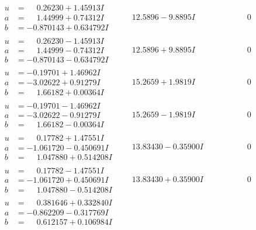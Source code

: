 \documentclass[1p]{elsarticle_modified}
\theoremstyle{definition}
\begin{document}
$$\begin{array}{c|c|c}
\begin{aligned}
u &= \phantom{-}0.26230 + 1.45913 I \\
a &= \phantom{-}1.44999 + 0.74312 I \\
b &= -0.870143 + 0.634792 I\end{aligned}
 & \phantom{-}12.5896 - 9.8895 I & \phantom{-0.000000 } 0 \\ \hline\begin{aligned}
u &= \phantom{-}0.26230 - 1.45913 I \\
a &= \phantom{-}1.44999 - 0.74312 I \\
b &= -0.870143 - 0.634792 I\end{aligned}
 & \phantom{-}12.5896 + 9.8895 I & \phantom{-0.000000 } 0 \\ \hline\begin{aligned}
u &= -0.19701 + 1.46962 I \\
a &= -3.02622 + 0.91279 I \\
b &= \phantom{-}1.66182 + 0.00364 I\end{aligned}
 & \phantom{-}15.2659 + 1.9819 I & \phantom{-0.000000 } 0 \\ \hline\begin{aligned}
u &= -0.19701 - 1.46962 I \\
a &= -3.02622 - 0.91279 I \\
b &= \phantom{-}1.66182 - 0.00364 I\end{aligned}
 & \phantom{-}15.2659 - 1.9819 I & \phantom{-0.000000 } 0 \\ \hline\begin{aligned}
u &= \phantom{-}0.17782 + 1.47551 I \\
a &= -1.061720 - 0.450691 I \\
b &= \phantom{-}1.047880 + 0.514208 I\end{aligned}
 & \phantom{-}13.83430 - 0.35900 I & \phantom{-0.000000 } 0 \\ \hline\begin{aligned}
u &= \phantom{-}0.17782 - 1.47551 I \\
a &= -1.061720 + 0.450691 I \\
b &= \phantom{-}1.047880 - 0.514208 I\end{aligned}
 & \phantom{-}13.83430 + 0.35900 I & \phantom{-0.000000 } 0 \\ \hline\begin{aligned}
u &= \phantom{-}0.381646 + 0.332840 I \\
a &= -0.862209 - 0.317769 I \\
b &= \phantom{-}0.612157 + 0.106984 I\end{aligned}

\end{array}$$
\end{document}
